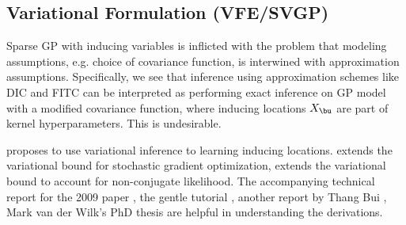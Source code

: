\documentclass[11pt]{article}
\begin{document}
\subsection{Variational Formulation (VFE/SVGP)}


Sparse GP with inducing variables is inflicted with the problem that modeling assumptions, e.g. choice of covariance function, is interwined with approximation assumptions. Specifically, we see that inference using approximation schemes like DIC and FITC can be interpreted as performing exact inference on GP model with a modified covariance function, where inducing locations $X_{\bu}$ are part of kernel hyperparameters. This is undesirable.

\cite{titsiasVariationalLearningInducing2009} proposes to use variational inference to learning inducing locations. \cite{hensmanGaussianProcessesBig2013} extends the variational bound for stochastic gradient optimization, \cite{hensmanScalableVariationalGaussian2014} extends the variational bound to account for non-conjugate likelihood. The accompanying technical report for the 2009 paper \cite{titsiasVariationalModelSelection2009}, the gentle tutorial \cite{galVariationalInferenceSparse2014}, another report by Thang Bui \cite{buiSparseApproximationsNonConjugate2014}, Mark van der Wilk's PhD thesis \cite{SparseGaussianProcess2018} are helpful in understanding the derivations.
\end{document}
